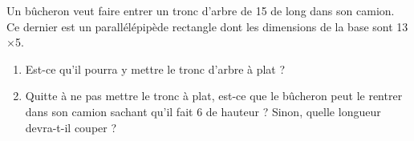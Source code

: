 
\begin{exercice}[\ldots/4]\label{exosmath-0597}

    Un bûcheron veut faire entrer un tronc d'arbre de \unit{15}{\meter} de long dans son camion. Ce dernier est un parallélépipède rectangle dont les dimensions de la base sont \unit{13}{\meter}$\times$\unit{5}{\meter}.

    \begin{enumerate}
        \item
            Est-ce qu'il pourra y mettre le tronc d'arbre à plat ?
        \item
            Quitte à ne pas mettre le tronc à plat, est-ce que le bûcheron peut le rentrer dans son camion sachant qu'il fait \unit{6}{\meter} de hauteur ? Sinon, quelle longueur devra-t-il couper ?
    \end{enumerate}

\end{exercice}
